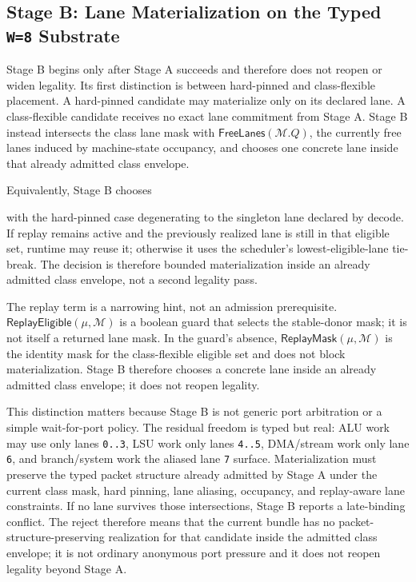 \documentclass[twocolumn]{article}
\begin{document}
\subsection{Stage B: Lane Materialization on the Typed \texttt{W=8} Substrate}

Stage B begins only after Stage A succeeds and therefore does not reopen or widen legality. Its first distinction is between hard-pinned and class-flexible placement. A hard-pinned candidate may materialize only on its declared lane. A class-flexible candidate receives no exact lane commitment from Stage A. Stage B instead intersects the class lane mask with \(\mathsf{FreeLanes}(\mathcal{M}.Q)\), the currently free lanes induced by machine-state occupancy, and chooses one concrete lane inside that already admitted class envelope.

Equivalently, Stage B chooses

with the hard-pinned case degenerating to the singleton lane declared by decode. If replay remains active and the previously realized lane is still in that eligible set, runtime may reuse it; otherwise it uses the scheduler's lowest-eligible-lane tie-break. The decision is therefore bounded materialization inside an already admitted class envelope, not a second legality pass.

The replay term is a narrowing hint, not an admission prerequisite. \(\mathsf{ReplayEligible}(\mu,\mathcal{M})\) is a boolean guard that selects the stable-donor mask; it is not itself a returned lane mask. In the guard's absence, \(\mathsf{ReplayMask}(\mu,\mathcal{M})\) is the identity mask for the class-flexible eligible set and does not block materialization. Stage B therefore chooses a concrete lane inside an already admitted class envelope; it does not reopen legality.

This distinction matters because Stage B is not generic port arbitration or a simple wait-for-port policy. The residual freedom is typed but real: ALU work may use only lanes \texttt{0..3}, LSU work only lanes \texttt{4..5}, DMA/stream work only lane \texttt{6}, and branch/system work the aliased lane \texttt{7} surface. Materialization must preserve the typed packet structure already admitted by Stage A under the current class mask, hard pinning, lane aliasing, occupancy, and replay-aware lane constraints. If no lane survives those intersections, Stage B reports a late-binding conflict. The reject therefore means that the current bundle has no packet-structure-preserving realization for that candidate inside the admitted class envelope; it is not ordinary anonymous port pressure and it does not reopen legality beyond Stage A.
\end{document}
